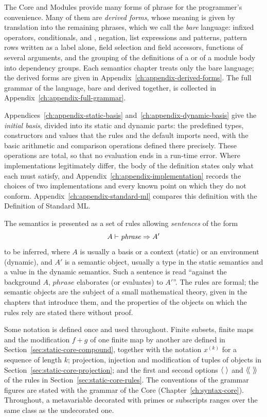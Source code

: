 The Core and Modules provide many forms of phrase for the programmer's
convenience. Many of them are \emph{derived forms}, whose meaning is given by
translation into the remaining phrases, which we call the \emph{bare}
language: infixed operators, conditionals, \kw{\&\&} and \kw{||}, negation,
list expressions and patterns, pattern rows written as a label alone, field
selection and field accessors,
functions of several arguments, and the grouping of the definitions of a
 or of a module body into dependency groups. Each semantics chapter
treats only the bare language; the derived forms are given in
Appendix~\ref{ch:appendix-derived-forms}. The full grammar of the language,
bare and derived together, is collected in
Appendix~\ref{ch:appendix-full-grammar}.

Appendices~\ref{ch:appendix-static-basis} and~\ref{ch:appendix-dynamic-basis}
give the \emph{initial basis}, divided into its static and dynamic parts:
the predefined types, constructors and values that the rules and the
default imports need, with the basic arithmetic and comparison operations
defined there precisely. %
These operations are total, so that no evaluation ends in a run-time
error. %
Where implementations legitimately differ, the body of the definition
states only what each must satisfy, and
Appendix~\ref{ch:appendix-implementation} records the choices of two
implementations and every known point on which they do not conform. %
Appendix~\ref{ch:appendix-standard-ml} compares this definition with the
Definition of Standard ML.

The semantics is presented as a set of rules allowing \emph{sentences} of the
form
\[
  A \vdash \mathit{phrase} \Rightarrow A'
\]
to be inferred, where $A$ is usually a basis or a context (static) or an
environment (dynamic), and $A'$ is a semantic object, usually a type in the
static semantics and a value in the dynamic semantics. Such a sentence is
read ``against the background $A$, $\mathit{phrase}$ elaborates (or
evaluates) to $A'$''. The rules are formal; the semantic objects are the
subject of a small mathematical theory, given in the chapters that
introduce them, and the properties of the objects on which the rules rely
are stated there without proof.

Some notation is defined once and used throughout. Finite subsets, finite
maps and the modification $f+g$ of one finite map by another are defined in
Section~\ref{sec:static-core-compound}, together with the notation
$x^{(k)}$ for a sequence of length $k$; projection, injection and
modification of tuples of objects in
Section~\ref{sec:static-core-projection}; and the first and second options
$\opt{\ }$ and $\langle\!\langle \ \rangle\!\rangle$ of the rules in
Section~\ref{sec:static-core-rules}. The conventions of the grammar figures
are stated with the grammar of the Core (Chapter~\ref{ch:syntax-core}).
Throughout, a metavariable decorated with primes or subscripts ranges over
the same class as the undecorated one.

